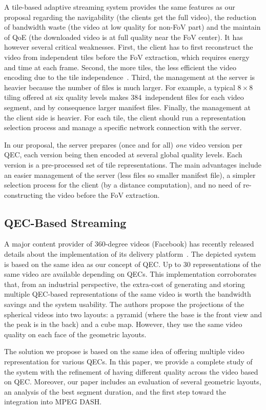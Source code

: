 A tile-based adaptive streaming
system provides the same features as our proposal regarding the navigability (the clients
get the full video), the reduction of bandwidth
waste (the video at low quality for non-\ac{FoV} part) and the maintain of \ac{QoE} (the downloaded video is at full quality near the
FoV center). It has however several critical weaknesses. First, the client has to first reconstruct
the video from independent tiles before the FoV extraction, which requires energy and
time at each frame. Second, the more tiles, the less efficient the video encoding due to the
tile independence~\cite{sanchez_compressed_2015}. Third, the management at the server is
heavier because the number of files
is much larger. For example, a typical $8\times8$ tiling offered at six quality levels makes
384~independent files for each video segment, and by consequence larger manifest files.
Finally, the management at the client side is heavier. For each tile, the client should run
a representation selection process
and manage a specific network connection with the server.

 In our proposal, the server prepares (once and for
all) \emph{one} video version per
\ac{QEC}, each version being then encoded at several global quality levels. Each version
is a pre-processed set of tile representations. The main advantages include an easier
management of the server
(less files so smaller manifest file), a simpler selection process for the client (by
a distance computation), and no need of re-constructing the video before the \ac{FoV} extraction.

\subsection{QEC-Based Streaming}

A major content provider of 360-degree videos (Facebook) has recently
released details about the
implementation of its delivery platform~\cite{facebook}. The depicted system is based
on the same idea as our concept of \ac{QEC}. Up to 30 representations of the same video
are available depending on
\acp{QEC}. This implementation corroborates that, from an industrial perspective, the
extra-cost of
generating and storing multiple \ac{QEC}-based representations of the same video
is worth the bandwidth
savings and the system usability. The authors propose the projections of the spherical videos into two layouts: a pyramid (where the
base is the front
view and the peak is in the back) and a cube map. However, they use the same video quality
on each face of the geometric layouts.

The
solution we propose is based on the same idea of offering multiple video representation
for various \acp{QEC}.
In this paper, we provide a complete study of
the system with the refinement of having different quality across the video based on \ac{QEC}.
Moreover, our
paper includes an evaluation of several geometric layouts, an analysis of the best segment
duration, and the first step toward the integration into MPEG \ac{DASH}. 